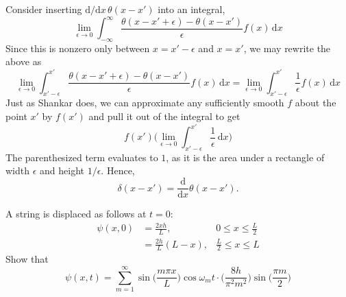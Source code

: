 \documentclass[../principles-of-quantum-mechanics.tex]{subfiles}
\begin{document}
\begin{questions}
\begin{solution}
	Consider inserting $\mathrm{d}/\mathrm{d}x\,\theta(x-x')$ into an integral,
	\[
		\lim_{\epsilon\to0}\int_{-\infty}^{\infty}\frac{\theta(x - x' + \epsilon) - \theta(x - x')}{\epsilon}f(x)\,\mathrm{d}x
	\]
	Since this is nonzero only between $x = x' - \epsilon$ and $x = x'$, we may rewrite the above as
	\[
		\lim_{\epsilon\to0}\int_{x' - \epsilon}^{x'}\frac{\theta(x - x' + \epsilon) - \theta(x - x')}{\epsilon}f(x)\,\mathrm{d}x = \lim_{\epsilon\to0}\int_{x'-\epsilon}^{x'}\frac{1}{\epsilon}f(x)\,\mathrm{d}x
	\]
	Just as Shankar does, we can approximate any sufficiently smooth $f$ about the point $x'$ by $f(x')$ and pull it out of the integral to get
	\[
		f(x')\Big(\lim_{\epsilon\to0}\int_{x'-\epsilon}^{x'}\frac{1}{\epsilon}\,\mathrm{d}x\Big)
	\]
	The parenthesized term evaluates to $1$, as it is the area under a rectangle of width $\epsilon$ and height $1/\epsilon$. Hence,
	\[
		\delta(x - x') = \frac{\mathrm{d}}{\mathrm{d}x}\theta(x-x').
	\]
\end{solution}

\question A string is displaced as follows at $t = 0$:
\begin{align*}
	\psi(x, 0) &= \frac{2xh}{L},  &0 \leq x \leq \frac{L}{2} \\
	&= \frac{2h}{L}(L - x), &\frac{L}{2} \leq x \leq L
\end{align*}
Show that
\[
	\psi(x, t) = \sum_{m=1}^{\infty}\sin\Big(\frac{m\pi{x}}{L}\Big)\cos\omega_mt\cdot\Big(\frac{8h}{\pi^2m^2}\Big)\sin\Big(\frac{\pi m}{2}\Big)
\]


\end{questions}
\end{document}
